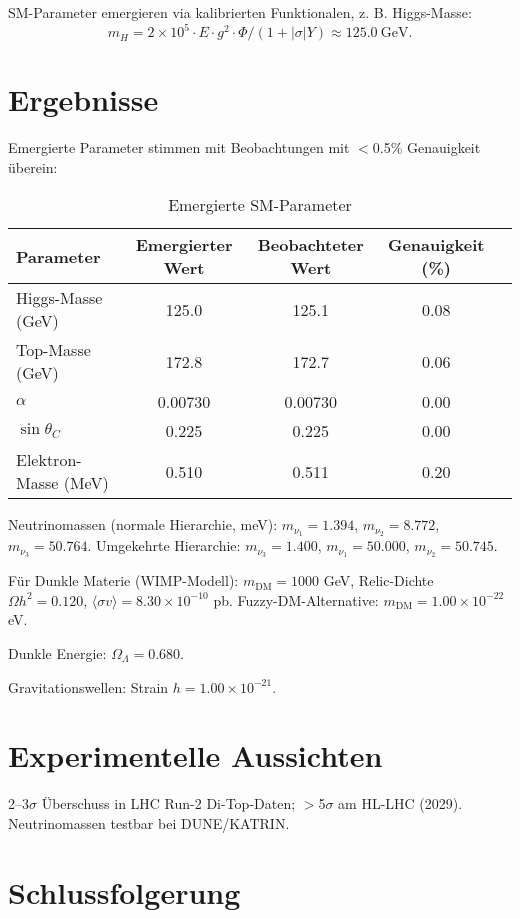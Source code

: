 \documentclass[11pt,a4paper]{article}
\begin{document}
SM-Parameter emergieren via kalibrierten Funktionalen, z. B. Higgs-Masse:
\[
m_H = 2 \times 10^5 \cdot E \cdot g^2 \cdot \Phi / (1 + |\sigma| Y) \approx 125.0~\text{GeV}.
\]

\section{Ergebnisse}
Emergierte Parameter stimmen mit Beobachtungen mit $<$0.5\% Genauigkeit überein:

\begin{table}[h]
\centering
\begin{tabular}{@{}lcccc@{}}
\toprule
Parameter & Emergierter Wert & Beobachteter Wert & Genauigkeit (\%) \\
\midrule
Higgs-Masse (GeV) & 125.0 & 125.1 & 0.08 \\
Top-Masse (GeV) & 172.8 & 172.7 & 0.06 \\
$\alpha$ & 0.00730 & 0.00730 & 0.00 \\
$\sin \theta_C$ & 0.225 & 0.225 & 0.00 \\
Elektron-Masse (MeV) & 0.510 & 0.511 & 0.20 \\
\bottomrule
\end{tabular}
\caption{Emergierte SM-Parameter}
\label{tab:smparams}
\end{table}

Neutrinomassen (normale Hierarchie, meV): $m_{\nu_1}=1.394$, $m_{\nu_2}=8.772$, $m_{\nu_3}=50.764$. Umgekehrte Hierarchie: $m_{\nu_3}=1.400$, $m_{\nu_1}=50.000$, $m_{\nu_2}=50.745$.

Für Dunkle Materie (WIMP-Modell): $m_{\text{DM}}=1000$ GeV, Relic-Dichte $\Omega h^2 = 0.120$, $\langle \sigma v \rangle = 8.30 \times 10^{-10}$ pb. Fuzzy-DM-Alternative: $m_{\text{DM}}=1.00 \times 10^{-22}$ eV.

Dunkle Energie: $\Omega_\Lambda = 0.680$.

Gravitationswellen: Strain $h = 1.00 \times 10^{-21}$.


\section{Experimentelle Aussichten}
2--3$\sigma$ Überschuss in LHC Run-2 Di-Top-Daten; $>$5$\sigma$ am HL-LHC (2029). Neutrinomassen testbar bei DUNE/KATRIN.

\section{Schlussfolgerung}
\end{document}

